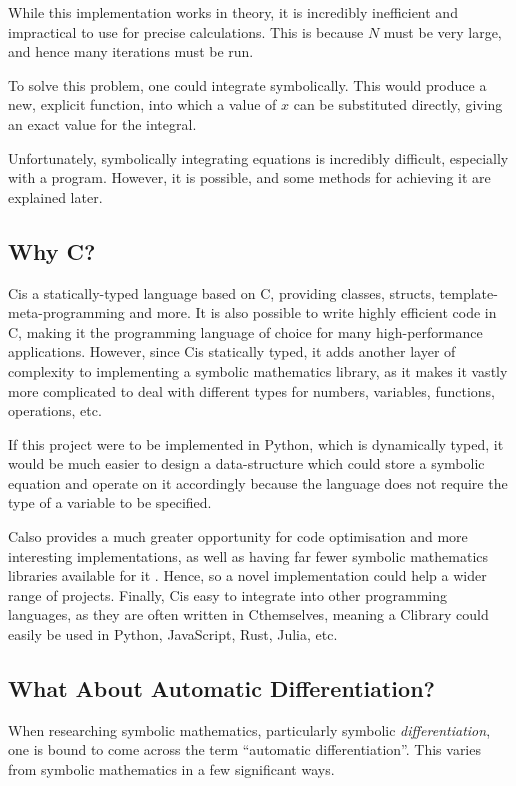 \documentclass[12pt]{article}
\def\CC{{C\nolinebreak[4]\hspace{-.05em}\raisebox{.4ex}{\tiny\bf ++ }}}
\begin{document}
While this implementation works in theory, it is incredibly inefficient and impractical to use for precise calculations. This is because $N$ must be very large, and hence many iterations must be run.

To solve this problem, one could integrate symbolically. This would produce a new, explicit function, into which a value of $x$ can be substituted directly, giving an exact value for the integral.

Unfortunately, symbolically integrating equations is incredibly difficult, especially with a program. However, it is possible, and some methods for achieving it are explained later.

\subsection{Why \CC?}

\CC is a statically-typed language based on C, providing classes, structs, template-meta-programming and more. It is also possible to write highly efficient code in \CC, making it the programming language of choice for many high-performance applications. However, since \CC is statically typed, it adds another layer of complexity to implementing a symbolic mathematics library, as it makes it vastly more complicated to deal with different types for numbers, variables, functions, operations, etc.

If this project were to be implemented in Python, which is dynamically typed, it would be much easier to design a data-structure which could store a symbolic equation and operate on it accordingly because the language does not require the type of a variable to be specified.

\CC also provides a much greater opportunity for code optimisation and more interesting implementations, as well as having far fewer symbolic mathematics libraries available for it \cite{githubmathlibs}. Hence, so a novel implementation could help a wider range of projects. Finally, \CC is easy to integrate into other programming languages, as they are often written in \CC themselves, meaning a \CC library could easily be used in Python, JavaScript, Rust, Julia, etc.

\subsection{What About Automatic Differentiation?}

When researching symbolic mathematics, particularly symbolic \textit{differentiation}, one is bound to come across the term ``automatic differentiation''. This varies from symbolic mathematics in a few significant ways.
\end{document}
